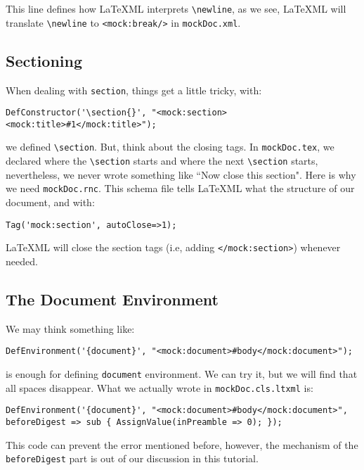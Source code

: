 \documentclass[a4paper]{article}
\def\latexml{{\LaTeX}ML\xspace}
\begin{document}
This line defines how \latexml interprets \lstinline|\newline|, as we see,
\latexml will translate \lstinline|\newline| to \lstinline|<mock:break/>| in
\lstinline|mockDoc.xml|.

\subsection{Sectioning}
 When dealing with \lstinline|section|, things get a little tricky, with:
\begin{lstlisting}
DefConstructor('\section{}', "<mock:section><mock:title>#1</mock:title>");
\end{lstlisting}
we defined \lstinline|\section|. But, think about the closing tags. In \lstinline|mockDoc.tex|, we declared where the \lstinline|\section| starts and where the next \lstinline|\section| starts, nevertheless, we never wrote something like ``Now close this section". Here is why we need \lstinline|mockDoc.rnc|. This schema file tells \latexml what the structure of our document, and with:
\begin{lstlisting}
Tag('mock:section', autoClose=>1);
\end{lstlisting}
\latexml will close the section tags (i.e, adding \lstinline|</mock:section>|) whenever needed.

\subsection{The Document Environment}
We may think something like:
\begin{lstlisting}
DefEnvironment('{document}', "<mock:document>#body</mock:document>");
\end{lstlisting}
is enough for defining \lstinline|document| environment. We can try it, but we will find that all spaces disappear. What we actually wrote in \lstinline|mockDoc.cls.ltxml| is:
\begin{lstlisting}
DefEnvironment('{document}', "<mock:document>#body</mock:document>", beforeDigest => sub { AssignValue(inPreamble => 0); });
\end{lstlisting}
This code can prevent the error mentioned before, however, the mechanism of the \lstinline|beforeDigest| part is out of our discussion in this tutorial.
\end{document}
